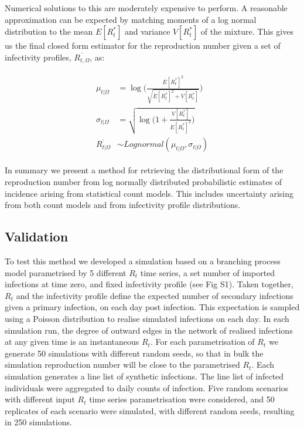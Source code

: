 \documentclass[10pt,letterpaper]{article}
\begin{document}
Numerical solutions to this are moderately expensive to perform. A reasonable approximation can be expected by matching moments of a log normal distribution to the mean $E[R_t^*]$ and variance $V[R_t^*]$ of the mixture. This gives us the final closed form estimator for the reproduction number given a set of infectivity profiles, $\overline{R_{t,\Omega}}$, as:

\begin{eqnarray}
\begin{aligned}
\mu_{t|\Omega} &= \log\bigg(\frac{E[R_t^*]^2}{\sqrt{E[R_t^*]^2 + V[R_t^*]}}\bigg) \\
\sigma_{t|\Omega} &= \sqrt{\log\bigg(1 + \frac{V[R_t^*]}{E[R_t^*]^2}\bigg)}\\
\overline{R_{t|\Omega}} &\sim Lognormal(\mu_{t|\Omega},\sigma_{t|\Omega})
\end{aligned}
\end{eqnarray}

In summary we present a method for retrieving the distributional form of the reproduction number from log normally distributed probabilistic estimates of incidence arising from statistical count models. This includes uncertainty arising from both count models and from infectivity profile distributions.

\subsection*{Validation}

To test this method we developed a simulation based on a branching process model parametrised by 5 different $R_t$ time series, a set number of imported infections at time zero, and fixed infectivity profile (see  Fig S1). Taken together, $R_t$ and the infectivity profile define the expected number of secondary infections given a primary infection, on each day post infection. This expectation is sampled using a Poisson distribution to realise simulated infections on each day. In each simulation run, the degree of outward edges in the network of realised infections at any given time is an instantaneous $R_t$. For each parametrisation of $R_t$ we generate 50 simulations with different random seeds, so that in bulk the simulation reproduction number will be close to the parametrised $R_t$. Each simulation generates a line list of synthetic infections. The line list of infected individuals were aggregated to daily counts of infection. Five random scenarios with different input $R_t$ time series parametrisation were considered, and 50 replicates of each scenario were simulated, with different random seeds, resulting in 250 simulations.
\end{document}
